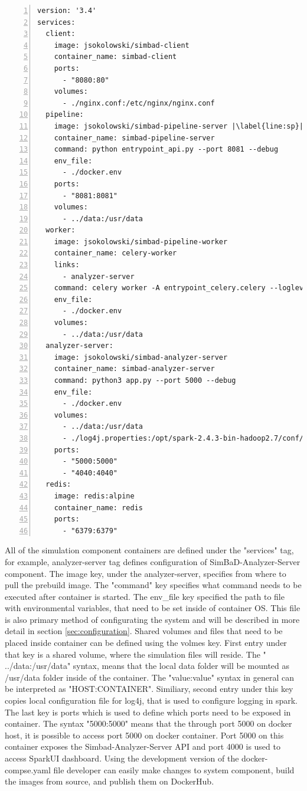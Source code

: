 \begin{lstlisting}[label=list:docker-compose,caption=prod-docker-compose.yaml file, basicstyle=\footnotesize\ttfamily, numbers=left, escapechar=|]
version: '3.4'
services:
  client:
    image: jsokolowski/simbad-client
    container_name: simbad-client
    ports:
      - "8080:80"
    volumes:
      - ./nginx.conf:/etc/nginx/nginx.conf
  pipeline:
    image: jsokolowski/simbad-pipeline-server |\label{line:sp}|
    container_name: simbad-pipeline-server
    command: python entrypoint_api.py --port 8081 --debug
    env_file:
      - ./docker.env
    ports:
      - "8081:8081"
    volumes:
      - ../data:/usr/data
  worker:
    image: jsokolowski/simbad-pipeline-worker
    container_name: celery-worker
    links:
      - analyzer-server
    command: celery worker -A entrypoint_celery.celery --loglevel=info
    env_file:
      - ./docker.env
    volumes:
      - ../data:/usr/data
  analyzer-server:
    image: jsokolowski/simbad-analyzer-server
    container_name: simbad-analyzer-server
    command: python3 app.py --port 5000 --debug
    env_file:
      - ./docker.env
    volumes:
      - ../data:/usr/data
      - ./log4j.properties:/opt/spark-2.4.3-bin-hadoop2.7/conf/log4j.properties
    ports:
      - "5000:5000"
      - "4040:4040"
  redis:
    image: redis:alpine
    container_name: redis
    ports:
      - "6379:6379"
\end{lstlisting}
All of the simulation component containers are defined under the "services" tag, for example, analyzer-server tag defines configuration of SimBaD-Analyzer-Server component. The image key, under the analyzer-server, specifies from where to pull the prebuild image. The "command" key specifies what command needs to be executed after container is started. The env\_file key specified the path to file with environmental variables, that need to be set inside of container OS. This file is also primary method of configurating the system and will be described in more detail in section  \ref{sec:configuration}. Shared volumes and files that need to be placed inside container can be defined using the volmes key. First entry under that key is a shared volume, where the simulation files will reside. The " ../data:/usr/data" syntax, means that the local data folder will be mounted as /usr/data folder inside of the container. The "value:value" syntax in general can be interpreted as "HOST:CONTAINER". Similiary, second entry under this key copies local configuration file for log4j, that is used to configure logging in spark. The last key is ports which is used to define which ports need to be exposed in container. The syntax "5000:5000" means that the through port 5000 on docker host, it is possible to access port 5000 on docker container. Port 5000 on this container exposes the  Simbad-Analyzer-Server API and port 4000 is used to access SparkUI dashboard.
Using the development version of the docker-compse.yaml file developer can easily make changes to system component, build the images from source, and publish them on DockerHub.
